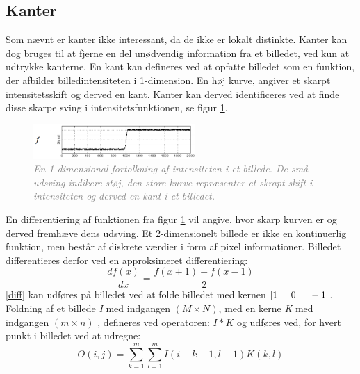 \subsection{Kanter}\label{subsec:kant}
Som nævnt er kanter ikke interessant, da de ikke er lokalt distinkte. Kanter kan dog bruges til at fjerne en del unødvendig information fra et billedet, ved kun at udtrykke kanterne.  En kant kan defineres ved at opfatte billedet som en funktion, der afbilder billedintensiteten i 1-dimension. En høj kurve, angiver et skarpt intensitetsskift og derved en kant. Kanter kan derved identificeres ved at finde disse skarpe sving i intensitetsfunktionen, se figur \ref{fig:kant}.
\noindent
\begin{figure}[H]
    \centering
    \includegraphics[width=0.55\textwidth]{fig/7.png}
     \vspace{-1em}
    \begin{center}        
     \caption{\textcolor{gray}{\footnotesize \textit{
     En 1-dimensional fortolkning af intensiteten i et billede. De små udsving indikere støj, den store kurve repræsenter et skrapt skift i intensiteten og derved en kant i et billedet.}}}
    \label{fig:kant}
     \end{center}
       \vspace{-2.5em}
  \end{figure}
\noindent
En differentiering af funktionen fra figur \ref{fig:kant} vil angive, hvor skarp kurven er og derved fremhæve dens udsving. Et 2-dimensionelt billede er ikke en kontinuerlig funktion, men består af diskrete værdier i form af pixel informationer.
Billedet differentieres derfor ved en approksimeret differentiering: \begin{equation}
\dfrac{df(x)}{dx}=\dfrac{f(x+1)-f(x-1)}{2}
\label{diff}
\end{equation}
\eqref{diff} kan udføres på billedet ved at folde billedet med kernen $[1 \hspace{0.5cm} 0 \hspace{0.5cm} -1]$. Foldning af et billede \emph{I} med indgangen $(M \times N)$, med en kerne \emph{K} med indgangen $(m \times n)$ , defineres ved operatoren: $I\ast K$ og udføres ved, for hvert punkt i billedet ved at udregne:
\begin{equation}
O(i,j) = \sum\limits_{k=1}^m \sum\limits_{l=1}^m I(i+k-1,l-1)K(k,l)
\end{equation}
